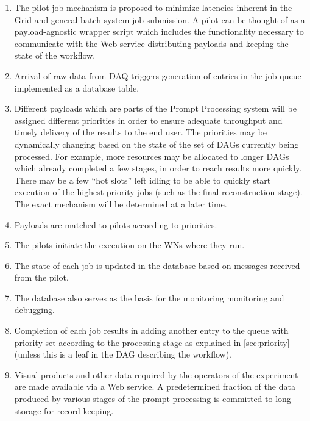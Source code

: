 \documentclass[pdftex,12pt,letter]{article}
\begin{document}
\begin{enumerate}

\item The pilot job mechanism is proposed to minimize latencies inherent in the Grid and general batch system job submission.
A pilot can be thought of as a payload-agnostic wrapper script which includes the functionality necessary to communicate
with the Web service distributing payloads and keeping the state of the workflow.

\item Arrival of raw data from DAQ triggers generation of entries in the job queue implemented as a database table.

\item Different payloads which are parts of the Prompt Processing system will be assigned different priorities in order to ensure
adequate throughput and timely delivery of the results to the end user. The priorities may be dynamically changing based on
the state of the set of DAGs currently being processed. For example, more resources may be allocated to longer DAGs which already
completed a few stages, in order to reach results more quickly. There may be a few ``hot slots'' left idling to be able to quickly
start execution of the highest priority jobs (such as the final reconstruction stage). The exact mechanism will be determined
at a later time.

\item Payloads are matched to pilots according to priorities.

\item The pilots initiate the execution on the WNs where they run.

\item The state of each job is updated in the database based on messages received from the pilot.

\item The database also serves as the basis for the monitoring monitoring and debugging.

\item Completion of each job results in adding another entry to the queue with priority set according to the processing stage as
explained in \ref{sec:priority} (unless this is a leaf in the DAG describing the workflow).

\item Visual products and other data required by the operators of the experiment are made available via a Web service.
A predetermined fraction of the data produced by various stages of the prompt processing is committed to long storage
for record keeping.


\end{enumerate}
\end{document}
